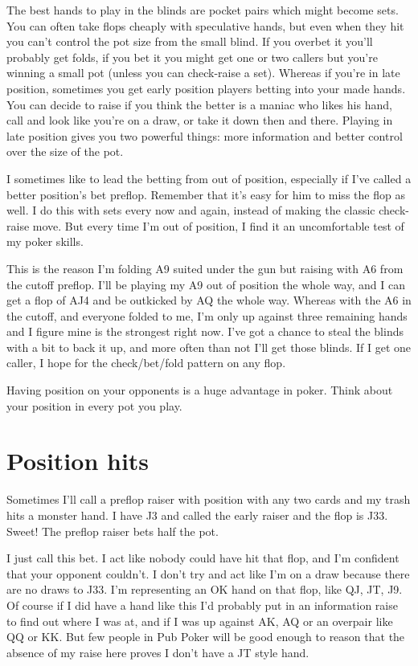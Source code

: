 The best hands to play in the blinds are pocket pairs which might become
sets. You can often take flops cheaply with speculative hands, but even
when they hit you can't control the pot size from the small blind. If you
overbet it you'll probably get folds, if you bet it you might get one or
two callers but you're winning a small pot (unless you can check-raise
a set). Whereas if you're in late position, sometimes you get early
position players betting into your made hands. You can decide to raise
if you think the better is a maniac who likes his hand, call and look
like you're on a draw, or take it down then and there. Playing in late
position gives you two powerful things: more information and better control
over the size of the pot.

I sometimes like to lead the betting from out of position, especially
if I've called a better position's bet preflop. Remember that
it's easy for him to miss the flop as well. I do this
with sets every now and again, instead of making the classic check-raise
move. But every time I'm out of position, I find it an
uncomfortable test of my poker skills.

This is the reason I'm folding A9 suited under the gun but raising
with A6 from the cutoff preflop. I'll be playing my A9 out of position the
whole way, and I can get a flop of AJ4 and be outkicked by AQ the
whole way. Whereas with the A6 in the cutoff, and everyone folded to me,
I'm only up against three remaining hands and I figure mine is
the strongest right now. I've got a chance to steal the blinds with a
bit to back it up, and more often than not I'll get those blinds. If I get
one caller, I hope for the check/bet/fold pattern on any flop.

Having position on your opponents is a huge advantage in poker. Think
about your position in every pot you play.

\section{Position hits}

Sometimes I'll call a preflop raiser with position with any two cards
and my trash hits a monster hand. I have J3 and called
the early raiser and the flop is J33. Sweet! The preflop raiser
bets half the pot.

I just call this bet. I act like nobody could have hit that flop, and
I'm confident that your opponent couldn't. I don't try and act like
I'm on a draw because there are no draws to J33. I'm representing an
OK hand on that flop, like QJ, JT, J9. Of course if I did have a hand
like this I'd probably put in an information raise to find out where
I was at, and if I was up against AK, AQ or an overpair like QQ or KK.
But few people in Pub Poker will be good enough to reason that the
absence of my raise here proves I don't have a JT style hand.

